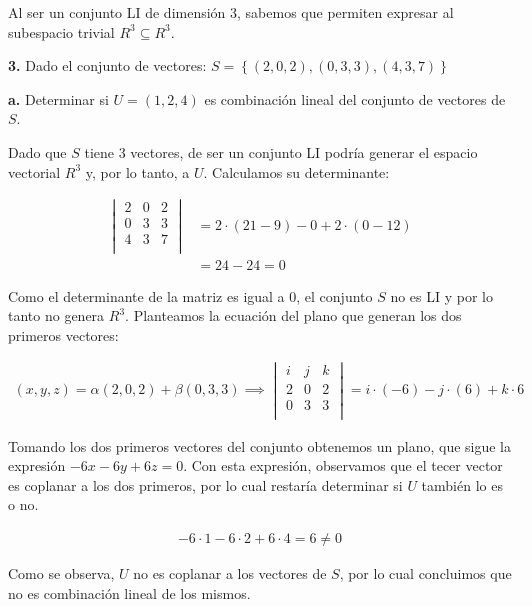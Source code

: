 \documentclass[12pt]{article}
\begin{document}
Al ser un conjunto LI de dimensión 3,
sabemos que permiten expresar al subespacio trivial \(R^{3} \subseteq R^{3}\).

\textbf{3.}
Dado el conjunto de vectores: \(S = \left\{(2,0,2), (0,3,3),(4,3,7)\right\}\)

\hspace{6mm}\textbf{a.}
Determinar si \(U = (1,2,4)\) es combinación lineal del conjunto de vectores de
\(S\).

Dado que \(S\) tiene 3 vectores,
de ser un conjunto LI podría generar el espacio vectorial \(R^{3}\) y,
por lo tanto,
a \(U\).
Calculamos su determinante:

\begin{align*}
  \begin{vmatrix}
    2 & 0 & 2 \\
    0 & 3 & 3 \\
    4 & 3 & 7 \\
  \end{vmatrix} & = 2 \cdot (21 - 9) - 0 + 2 \cdot (0 - 12) \\
                  & = 24 - 24 = \boxed{0}
\end{align*}

Como el determinante de la matriz es igual a 0,
el conjunto \(S\) no es LI y por lo tanto no genera \(R^{3}\).
Planteamos la ecuación del plano que generan los dos primeros vectores:

\begin{align*}
  (x,y,z) = \alpha(2,0,2) + \beta(0,3,3) \implies
  \begin{vmatrix}
    i & j & k \\
    2 & 0 & 2 \\
    0 & 3 & 3 \\
  \end{vmatrix} = i \cdot (-6) - j \cdot (6) + k \cdot 6
\end{align*}

Tomando los dos primeros vectores del conjunto obtenemos un plano,
que sigue la expresión \(-6x-6y+6z=0\).
Con esta expresión,
observamos que el tecer vector es coplanar a los dos primeros,
por lo cual restaría determinar si \(U\) también lo es o no.

\begin{align*}
  -6 \cdot 1 - 6 \cdot 2 + 6 \cdot 4 = \boxed{6 \neq 0}
\end{align*}

Como se observa,
\(U\) no es coplanar a los vectores de \(S\),
por lo cual concluimos que no es combinación lineal de los mismos.
\end{document}

